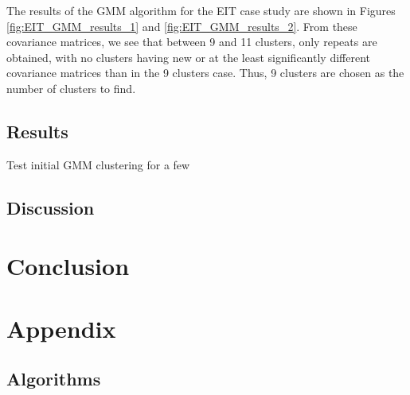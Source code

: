 \documentclass[12pt]{report} %
\begin{document}
The results of the GMM algorithm for the EIT case study are shown in Figures \ref{fig:EIT_GMM_results_1} and \ref{fig:EIT_GMM_results_2}. From these covariance matrices, we see that between 9 and 11 clusters, only repeats are obtained, with no clusters having new or at the least significantly different covariance matrices than in the 9 clusters case. Thus, 9 clusters are chosen as the number of clusters to find.

\section{Results}

Test initial GMM clustering for a few

\section{Discussion}

\chapter{Conclusion}


\chapter{Appendix}

\section{Algorithms}
\end{document}
